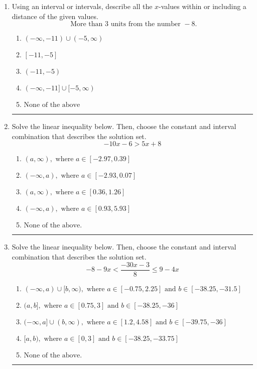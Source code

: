 \documentclass[14pt]{extbook}
\newcommand{\litem}[1]{\item#1\hspace*{-1cm}\rule{\textwidth}{0.4pt}}
\begin{document}
\begin{enumerate}
\litem{
Using an interval or intervals, describe all the $x$-values within or including a distance of the given values.\[ \text{ More than } 3 \text{ units from the number } -8. \]\begin{enumerate}[label=\Alph*.]
\item \( (-\infty, -11) \cup (-5, \infty) \)
\item \( [-11, -5] \)
\item \( (-11, -5) \)
\item \( (-\infty, -11] \cup [-5, \infty) \)
\item \( \text{None of the above} \)

\end{enumerate} }
\litem{
Solve the linear inequality below. Then, choose the constant and interval combination that describes the solution set.\[ -10x -6 > 5x + 8 \]\begin{enumerate}[label=\Alph*.]
\item \( (a, \infty), \text{ where } a \in [-2.97, 0.39] \)
\item \( (-\infty, a), \text{ where } a \in [-2.93, 0.07] \)
\item \( (a, \infty), \text{ where } a \in [0.36, 1.26] \)
\item \( (-\infty, a), \text{ where } a \in [0.93, 5.93] \)
\item \( \text{None of the above}. \)

\end{enumerate} }
\litem{
Solve the linear inequality below. Then, choose the constant and interval combination that describes the solution set.\[ -8 - 9 x < \frac{-30 x - 3}{8} \leq 9 - 4 x \]\begin{enumerate}[label=\Alph*.]
\item \( (-\infty, a) \cup [b, \infty), \text{ where } a \in [-0.75, 2.25] \text{ and } b \in [-38.25, -31.5] \)
\item \( (a, b], \text{ where } a \in [0.75, 3] \text{ and } b \in [-38.25, -36] \)
\item \( (-\infty, a] \cup (b, \infty), \text{ where } a \in [1.2, 4.58] \text{ and } b \in [-39.75, -36] \)
\item \( [a, b), \text{ where } a \in [0, 3] \text{ and } b \in [-38.25, -33.75] \)
\item \( \text{None of the above.} \)


\end{enumerate}}
\end{enumerate}
\end{document}
